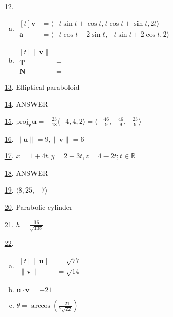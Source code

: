 \documentclass[fleqn]{article}
\renewcommand{\vec}[1]{\mathbf{#1}}
\begin{document}
\begin{itemize}
\item[\hyperlink{12-problem}{12}.]\hypertarget{12-answer}{}\begin{enumerate}[a.]
  \item
    \(\begin{aligned}[t]
      \vec v&=\langle-t\sin t+\cos t,t\cos t+\sin t,2t\rangle \\
      \vec a&=\langle-t\cos t-2\sin t,-t\sin t+2\cos t,2\rangle
    \end{aligned}\)
  \item
    \(\begin{aligned}[t]
      \|\vec v\|&=\frac{}{} \\
      \vec T&= \\
      \vec N&=
    \end{aligned}\)
\end{enumerate}
\smallskip

\item[\hyperlink{13-problem}{13}.]\hypertarget{13-answer}{}Elliptical paraboloid
\smallskip

\item[\hyperlink{14-problem}{14}.]\hypertarget{14-answer}{}ANSWER
\smallskip

\item[\hyperlink{15-problem}{15}.]\hypertarget{15-answer}{}$\text{proj}_{\vec v}\vec u=
-\frac{23}{18}\langle -4,4,2\rangle=
\langle -\frac{46}{9},-\frac{46}{9},-\frac{23}{9}\rangle$
\smallskip

\item[\hyperlink{16-problem}{16}.]\hypertarget{16-answer}{}$\|\vec u\|=9,\|\vec v\|=6$
\smallskip

\item[\hyperlink{17-problem}{17}.]\hypertarget{17-answer}{}$x=1+4t,y=2-3t,z=4-2t;t\in\mathbb{R}$
\smallskip

\item[\hyperlink{18-problem}{18}.]\hypertarget{18-answer}{}ANSWER
\smallskip

\item[\hyperlink{19-problem}{19}.]\hypertarget{19-answer}{}$\langle 8,25,-7\rangle$
\smallskip

\item[\hyperlink{20-problem}{20}.]\hypertarget{20-answer}{}Parabolic cylinder
\smallskip

\item[\hyperlink{21-problem}{21}.]\hypertarget{21-answer}{}$h=\frac{16}{\sqrt{138}}$
\smallskip

\item[\hyperlink{22-problem}{22}.]\hypertarget{22-answer}{}\begin{enumerate}[a.]
  \item
    \(\begin{aligned}[t]
      \|\vec u\|&=\sqrt{77} \\
      \|\vec v\|&=\sqrt{14}
    \end{aligned}\)
  \item \(\vec u\cdot\vec v=-21\)
  \item \(\theta=\arccos\left(\frac{-21}{7\sqrt{22}}\right)\)
\end{enumerate}
\smallskip


\end{itemize}
\end{document}
